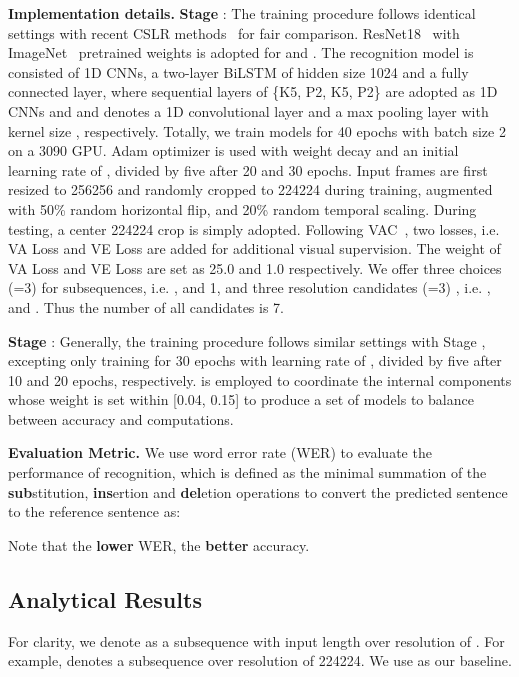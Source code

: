 \documentclass[sigconf]{acmart}
\begin{document}
\textbf{Implementation details.}
\textbf{Stage \uppercase\expandafter{}}: The training procedure follows identical settings with recent CSLR methods~\cite{Min_2021_ICCV,cheng2020fully,pu2020boosting,niu2020stochastic} for fair comparison. ResNet18~\cite{he2016deep} with ImageNet~\cite{deng2009imagenet} pretrained weights is adopted for  and . The recognition model is consisted of 1D CNNs, a two-layer BiLSTM of hidden size 1024 and a fully connected layer, where sequential layers of \{K5, P2, K5, P2\} are adopted as 1D CNNs and  and  denotes a 1D convolutional layer and a max pooling layer with kernel size , respectively. Totally, we train models for 40 epochs with batch size 2 on a 3090 GPU. Adam optimizer is used with weight decay  and an initial learning rate of , divided by five after 20 and 30 epochs. Input frames are first resized to 256256 and randomly cropped to 224224 during training, augmented with 50\% random horizontal flip, and 20\% random temporal scaling. During testing, a center 224224 crop is simply adopted. Following VAC~\cite{Min_2021_ICCV}, two losses, i.e. VA Loss and VE Loss are added for additional visual supervision. The weight of VA Loss and VE Loss are set as 25.0 and 1.0 respectively.  We offer three choices (=3) for subsequences, i.e. ,  and 1, and three resolution candidates (=3) , i.e. ,  and . Thus the number of all candidates is 7. 

\textbf{Stage \uppercase\expandafter{}}: Generally, the training procedure follows similar settings with Stage \uppercase\expandafter{}, excepting only training for 30 epochs with learning rate of , divided by five after 10 and 20 epochs, respectively.  is employed to coordinate the internal components whose weight  is set within [0.04, 0.15] to produce a set of models to balance between accuracy and computations.

\textbf{Evaluation Metric.} 
We use word error rate (WER) to evaluate the performance of recognition, which is defined as the minimal summation of the \textbf{sub}stitution, \textbf{ins}ertion and \textbf{del}etion operations to convert the predicted sentence to the reference sentence as:
  
Note that the \textbf{lower} WER, the \textbf{better} accuracy.


\subsection{Analytical Results}
For clarity, we denote  as a subsequence with  input length over resolution of . For example,  denotes a  subsequence over resolution of 224224.  We use  as our baseline. 
\end{document}
